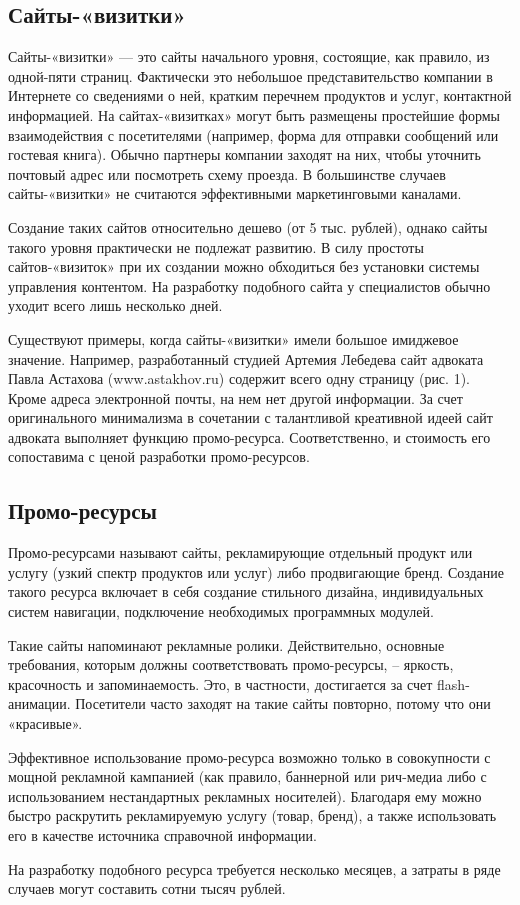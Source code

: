 \documentclass[a4paper,english,russian]{G2-105}
\begin{document}
\subsection{Сайты-«визитки»}
\par Сайты-«визитки» --- это сайты начального уровня, состоящие, как правило, из одной-пяти страниц. Фактически это небольшое представительство компании в Интернете со сведениями о ней, кратким перечнем продуктов и услуг, контактной информацией. На сайтах-«визитках» могут быть размещены простейшие формы взаимодействия с посетителями (например, форма для отправки сообщений или гостевая книга). Обычно партнеры компании заходят на них, чтобы уточнить почтовый адрес или посмотреть схему проезда. В большинстве случаев сайты-«визитки» не считаются эффективными маркетинговыми каналами.
\par Создание таких сайтов относительно дешево (от 5 тыс. рублей), однако сайты такого уровня практически не подлежат развитию. В силу простоты сайтов-«визиток» при их создании можно обходиться без установки системы управления контентом. На разработку подобного сайта у специалистов обычно уходит всего лишь несколько дней.
\par Существуют примеры, когда сайты-«визитки» имели большое имиджевое значение. Например, разработанный студией Артемия Лебедева сайт адвоката Павла Астахова (www.astakhov.ru) содержит всего одну страницу (рис. 1). Кроме адреса электронной почты, на нем нет другой информации. За счет оригинального минимализма в сочетании с талантливой креативной идеей сайт адвоката выполняет функцию промо-ресурса. Соответственно, и стоимость его сопоставима с ценой разработки промо-ресурсов.

\subsection{Промо-ресурсы}
\par Промо-ресурсами называют сайты, рекламирующие отдельный продукт или услугу (узкий спектр продуктов или услуг) либо продвигающие бренд. Создание такого ресурса включает в себя создание стильного дизайна, индивидуальных систем навигации, подключение необходимых программных модулей.
\par Такие сайты напоминают рекламные ролики. Действительно, основные требования, которым должны соответствовать промо-ресурсы, – яркость, красочность и запоминаемость. Это, в частности, достигается за счет flash-анимации. Посетители часто заходят на такие сайты повторно, потому что они «красивые».
\par Эффективное использование промо-ресурса возможно только в совокупности с мощной рекламной кампанией (как правило, баннерной или рич-медиа либо с использованием нестандартных рекламных носителей). Благодаря ему можно быстро раскрутить рекламируемую услугу (товар, бренд), а также использовать его в качестве источника справочной информации.
\par На разработку подобного ресурса требуется несколько месяцев, а затраты в ряде случаев могут составить сотни тысяч рублей.
\end{document}
